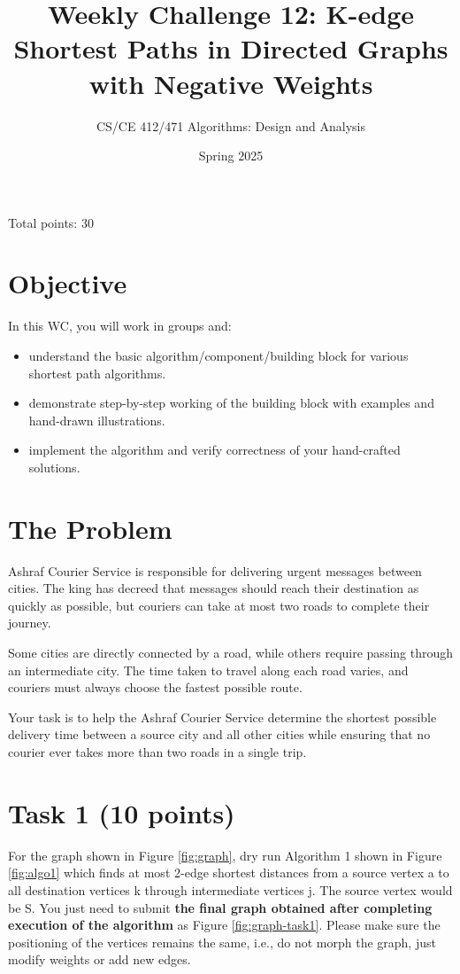 \documentclass[a4paper]{article}
\title{Weekly Challenge 12: K-edge Shortest Paths in Directed Graphs with Negative Weights}
\author{CS/CE 412/471 Algorithms: Design and Analysis}
\date{Spring 2025}
\begin{document}
\maketitle
\thispagestyle{empty}
\begin{center}
Total points: 30
\end{center}

\section*{Objective}
In this WC, you will work in groups and:
\begin{itemize}
    \item understand the basic algorithm/component/building block for various shortest path algorithms.
    \item demonstrate step-by-step working of the building block with examples and hand-drawn illustrations.
    \item implement the algorithm and verify correctness of your hand-crafted solutions.
\end{itemize}

\section*{The Problem}
Ashraf Courier Service is responsible for delivering urgent messages between cities. The king has decreed that messages should reach their destination as quickly as possible, but couriers can take at most two roads to complete their journey.

Some cities are directly connected by a road, while others require passing through an intermediate city. The time taken to travel along each road varies, and couriers must always choose the fastest possible route.

Your task is to help the Ashraf Courier Service determine the shortest possible delivery time between a source city and all other cities while ensuring that no courier ever takes more than two roads in a single trip.

\section*{Task 1 (10 points)}
For the graph shown in Figure \ref{fig:graph}, dry run Algorithm 1 shown in Figure \ref{fig:algo1} which finds at most 2-edge shortest distances from a source vertex a to all destination vertices k through intermediate vertices j. The source vertex would be S. You just need to submit \textbf{the final graph obtained after completing execution of the algorithm} as Figure \ref{fig:graph-task1}. Please make sure the positioning of the vertices remains the same, i.e., do not morph the graph, just modify weights or add new edges.
\end{document}
